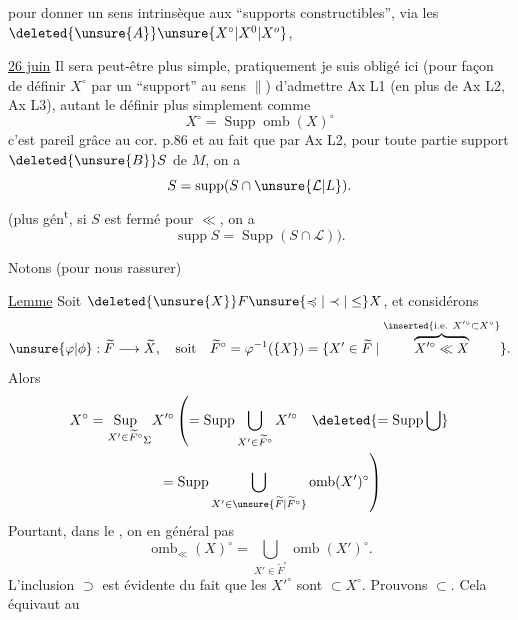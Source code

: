 pour donner un sens intrinsèque aux ``supports constructibles'', via les $\deleted{\unsure{A}}\unsure{X^\circ|X^0|X^o}$,

\uline{26 juin} Il sera peut-être plus simple,  pratiquement je suis obligé ici  (pour  façon de définir $X^\circ$ par un ``support'' au sens $\parallel$)  d'admettre Ax L1 (en plus de Ax L2, Ax L3), autant le définir plus simplement comme
\[
X^\circ=\operatorname{Supp}\operatorname{omb}(X)^\circ
\]
c'est pareil grâce au cor. p.86 et au fait que  par Ax L2, pour toute partie support $\deleted{\unsure{B}}S$ de $M$, on a
\[
S=\operatorname{supp}(S\cap\unsure{\mathcal L|L}).
\]
(plus gén\textsuperscript{t}, si $S$ est fermé pour $\ll$, on a
\[
\operatorname{supp}S=\operatorname{Supp}(S\cap\mathcal L)\text{)}.
\]

Notons  (pour nous rassurer)

\uline{Lemme} Soit $\deleted{\unsure{X}}F\unsure{\preccurlyeq|\prec|\leq}X$,  et considérons
\margin{$\big\vert\!\big\vert$}
\[
\unsure{\varphi|\phi}:\widetilde F\longrightarrow\widetilde X,\quad\text{soit}\quad\widetilde F^\circ=\varphi^{-1}(\{X\})=\{X'\in\widetilde F\mid \overbrace{X'^\circ\ll X}^{\inserted{\text{i.e. }X'^\circ\subset X^\circ}}\}.
\]
Alors
\[
\begin{aligned}
X^\circ&=\underset{X'\in\widetilde F^\circ}{\operatorname{Sup}}_\Sigma X'^\circ
\left(=\operatorname{Supp}\bigcup_{X'\in\widetilde F^\circ}X'^\circ\quad\deleted{=\operatorname{Supp}\bigcup}\right.\\
&\hspace{5em}\left.=\operatorname{Supp}\bigcup_{X'\in\unsure{\widetilde F|\widetilde F^\circ}}\operatorname{omb}(X')^\circ\right)
\end{aligned}
\]
Pourtant, dans le , on  en général pas
\[
\operatorname{omb}_{\ll}(X)^\circ=\bigcup_{X'\in\widetilde F^\circ}\operatorname{omb}(X')^\circ.
\]
L'inclusion $\supset$ est évidente du fait que les $X'^\circ$ sont $\subset X^\circ$. Prouvons $\subset$.
 Cela équivaut au
